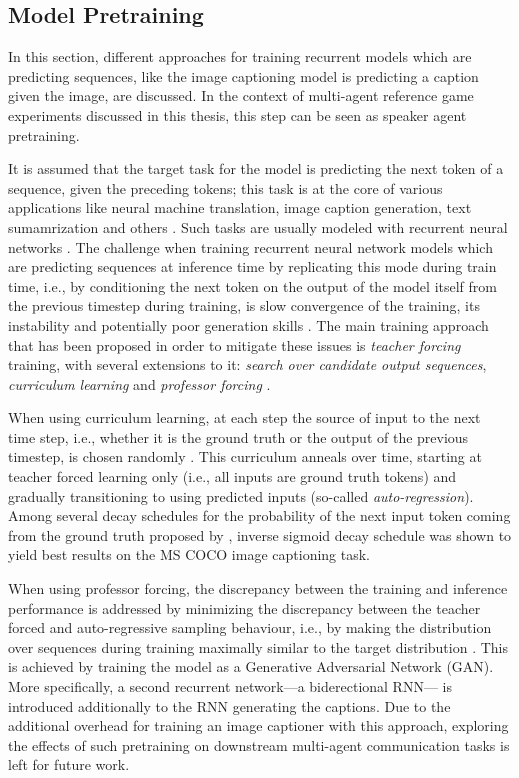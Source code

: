 \subsection{Model Pretraining}
\label{model_pretraining}
In this section, different approaches for training recurrent models which are predicting sequences, like the image captioning model is predicting a caption given the image, are discussed. In the context of multi-agent reference game experiments discussed in this thesis, this step can be seen as speaker agent pretraining.

It is assumed that the target task for the model is predicting the next token of a sequence, given the preceding tokens; this task is at the core of various applications like neural machine translation, image caption generation, text sumamrization and others \parencite[e.~g.,][]{cho2014learning, sutskever2014sequence}. Such tasks are usually modeled with recurrent neural networks \parencite{rumelhart1986learning}. The challenge when training recurrent neural network models which are predicting sequences at inference time by replicating this mode during train time, i.e., by conditioning the next token on the output of the model itself from the previous timestep during training, is slow convergence of the training, its instability and potentially poor generation skills \parencite{lamb2016professor}. The main training approach that has been proposed in order to mitigate these issues is \textit{teacher forcing} training, with several extensions to it: \textit{search over candidate output sequences}, \textit{curriculum learning} and \textit{professor forcing} \parencite{goodfellow2016deep, williams1989algorithm}.

When using curriculum learning, at each step the source of input to the next time step, i.e., whether it is the ground truth or the output of the previous timestep, is chosen randomly \parencite{bengio2015scheduled}. This curriculum anneals over time, starting at teacher forced learning only (i.e., all inputs are ground truth tokens) and gradually transitioning to using predicted inputs (so-called \textit{auto-regression}). Among several decay schedules for the probability of the next input token coming from the ground truth proposed by \cite{bengio2015scheduled}, inverse sigmoid decay schedule  was shown to yield best results on the MS COCO image captioning task.

When using professor forcing, the discrepancy between the training and inference performance is addressed by minimizing the discrepancy between the teacher forced and auto-regressive sampling behaviour, i.e., by making the distribution over sequences during training maximally similar to the target distribution \parencite{lamb2016professor}. This is achieved by training the model as a Generative Adversarial Network (GAN). More specifically, a second recurrent network---a biderectional RNN---  is introduced additionally to the RNN generating the captions. Due to the additional overhead for training an image captioner with this approach, exploring the effects of such pretraining on downstream multi-agent communication tasks is left for future work.

